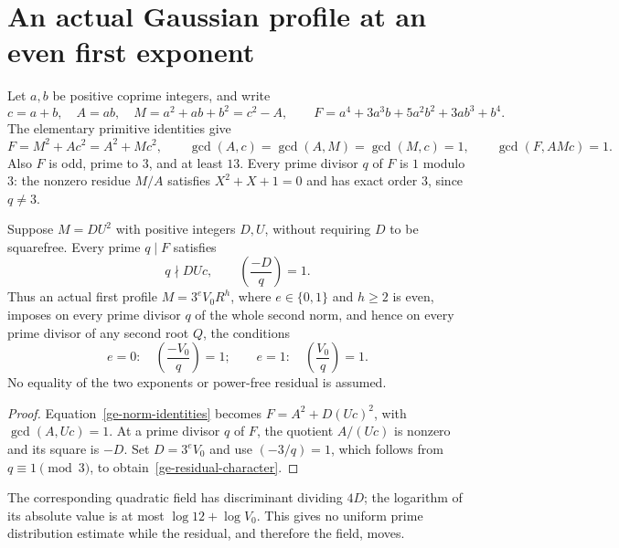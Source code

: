 \section{An actual Gaussian profile at an even first exponent}
\label{ge-section}

Let $a,b$ be positive coprime integers, and write
\[
 c=a+b,\quad A=ab,\quad M=a^2+ab+b^2=c^2-A,\qquad
 F=a^4+3a^3b+5a^2b^2+3ab^3+b^4.
\]
The elementary primitive identities give
\begin{equation}\label{ge-norm-identities}
 F=M^2+Ac^2=A^2+Mc^2,
 \qquad \gcd(A,c)=\gcd(A,M)=\gcd(M,c)=1,
 \qquad \gcd(F,AMc)=1.
\end{equation}
Also $F$ is odd, prime to $3$, and at least $13$. Every prime divisor
$q$ of $F$ is $1$ modulo $3$: the nonzero residue $M/A$ satisfies
$X^2+X+1=0$ and has exact order $3$, since $q\ne3$.

\begin{theorem}\label{ge-character}
Suppose $M=DU^2$ with positive integers $D,U$, without requiring $D$ to
be squarefree. Every prime $q\mid F$ satisfies
\begin{equation}\label{ge-quadratic-character}
 q\nmid DUc,\qquad \left(\frac{-D}{q}\right)=1.
\end{equation}
Thus an actual first profile $M=3^eV_0R^h$, where $e\in\{0,1\}$ and
$h\ge2$ is even, imposes on every prime divisor $q$ of the whole second
norm, and hence on every prime divisor of any second root $Q$, the
conditions
\begin{equation}\label{ge-residual-character}
 e=0:\quad\left(\frac{-V_0}{q}\right)=1;
 \qquad
 e=1:\quad\left(\frac{V_0}{q}\right)=1.
\end{equation}
No equality of the two exponents or power-free residual is assumed.
\end{theorem}
\begin{proof}
Equation~\eqref{ge-norm-identities} becomes
$F=A^2+D(Uc)^2$, with $\gcd(A,Uc)=1$. At a prime divisor $q$ of $F$,
the quotient $A/(Uc)$ is nonzero and its square is $-D$.
Set $D=3^eV_0$ and use $(-3/q)=1$, which follows from $q\equiv1\pmod3$,
to obtain~\eqref{ge-residual-character}.
\end{proof}
The corresponding quadratic field has discriminant dividing $4D$;
the logarithm of its absolute value is at most $\log12+\log V_0$.
This gives no uniform prime
distribution estimate while the residual, and therefore the field, moves.

